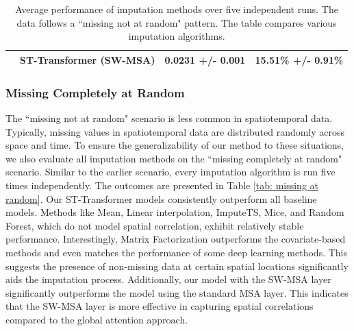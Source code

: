 \documentclass[11pt]{article}
\begin{document}
\begin{table}[h!]
\begin{tabularx}{\textwidth}{llXX}
        &\textbf{ST-Transformer (SW-MSA)} & 0.0231 +/- 0.001 & 15.51\% +/- 0.91\%\\
        \bottomrule
        

    \end{tabularx}
    \caption{Average performance of imputation methods over five independent runs. The data follows a ``missing not at random" pattern. The table compares various imputation algorithms.}
    \label{tab: missing at time points}
\end{table}






\subsubsection*{Missing Completely at Random}
The ``missing not at random" scenario is less common in spatiotemporal data. Typically, missing values in spatiotemporal data are distributed randomly across space and time. To ensure the generalizability of our method to these situations, we also evaluate all imputation methods on the ``missing completely at random" scenario. Similar to the earlier scenario, every imputation algorithm is run five times independently. The outcomes are presented in Table \ref{tab: missing at random}. Our ST-Transformer models consistently outperform all baseline models. Methods like Mean, Linear interpolation, ImputeTS, Mice, and Random Forest, which do not model spatial correlation, exhibit relatively stable performance. Interestingly, Matrix Factorization outperforms the covariate-based methods and even matches the performance of some deep learning methods. This suggests the presence of non-missing data at certain spatial locations significantly aids the imputation process. Additionally, our model with the SW-MSA layer significantly outperforms the model using the standard MSA layer. This indicates that the SW-MSA layer is more effective in capturing spatial correlations compared to the global attention approach.
\end{document}
